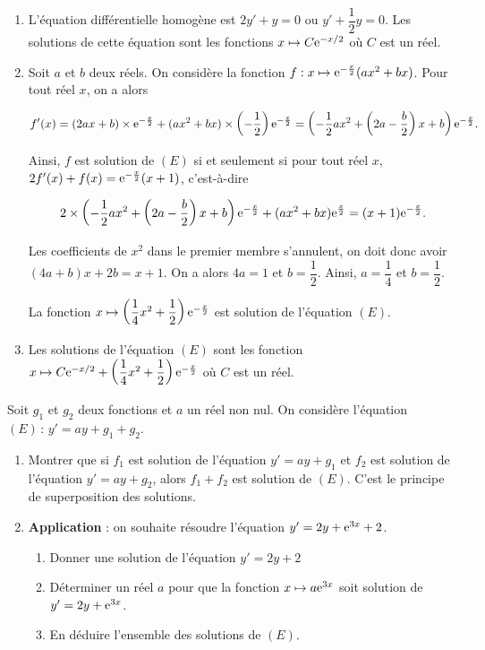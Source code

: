 \documentclass[11pt,fleqn, openany]{book} %
\begin{document}
\begin{solution}\hspace{0pt}

\begin{enumerate}\item  L'équation différentielle homogène est \(2y'+y=0\) ou \(y'+\dfrac{1}{2}y=0\). Les solutions de cette équation sont les fonctions \(x\mapsto C\mathrm{e}^{-x/2}\) où \(C\) est un réel.
\item Soit \(a\) et \(b\) deux réels. On considère la fonction \(f:x\mapsto \mathrm{e}^{-\frac{x}{2}}(ax^2+bx)\). Pour tout réel \(x\), on a alors

\[f'(x)=(2ax+b) \times \mathrm{e}^{-\frac{x}{2}}+(ax^2+bx) \times \left(-\dfrac{1}{2}\right)\mathrm{e}^{-\frac{x}{2}}=\left(-\dfrac{1}{2} ax^2+\left(2a-\dfrac{b}{2}\right)x+b\right)\mathrm{e}^{-\frac{x}{2}}.\]

Ainsi, \(f\) est solution de \((E)\) si et seulement si pour tout réel \(x\), \(2f'(x)+f(x)=\mathrm{e}^{-\frac{x}{2}}(x+1)\), c'est-à-dire

\[2 \times \left(-\dfrac{1}{2} ax^2+\left(2a-\dfrac{b}{2}\right)x+b\right)\mathrm{e}^{-\frac{x}{2}} + (ax^2+bx)\mathrm{e}^{\frac{x}{2}}=(x+1)\mathrm{e}^{-\frac{x}{2}}.\]

Les coefficients de \(x^2\) dans le premier membre s'annulent, on doit donc avoir \(\left(4a+b\right)x+2b=x+1\). On a alors \(4a=1\) et \(b=\dfrac{1}{2}\). Ainsi, \(a=\dfrac{1}{4}\) et \(b=\dfrac{1}{2}\).

La fonction \(x\mapsto \left(\dfrac{1}{4}x^2+\dfrac{1}{2}\right)\mathrm{e}^{-\frac{x}{2}}\) est solution de l'équation \((E)\).


\item Les solutions de l'équation \((E)\) sont les fonction \(x\mapsto C\mathrm{e}^{-x/2}+\left(\dfrac{1}{4}x^2+\dfrac{1}{2}\right)\mathrm{e}^{-\frac{x}{2}}\) où \(C\) est un réel.\end{enumerate}
  \end{solution}
  
  

\begin{exercise}[topic=diff03]Soit $g_1$ et $g_2$ deux fonctions et $a$ un réel non nul.
On considère l'équation $(E)\,:\,y'=ay+g_1+g_2$.
\begin{enumerate}
\item Montrer que si $f_1$ est solution de l'équation $y'=ay+g_1$ et $f_2$ est solution de l'équation $y'=ay+g_2$, alors $f_1+f_2$ est solution de $(E)$. C'est le principe de superposition des solutions.
\item \textbf{Application} : on souhaite résoudre l'équation $y'=2y+\mathrm{e}^{3x}+2$.
\begin{enumerate}
\item Donner une solution de l'équation $y'=2y+2$
\item Déterminer un réel $a$ pour que la fonction $x\mapsto a\mathrm{e}^{3x}$ soit solution de $y'=2y+\mathrm{e}^{3x}$.
\item En déduire l'ensemble des solutions de $(E)$.
\end{enumerate}
\end{enumerate}\newpage \end{exercise}
\end{document}

